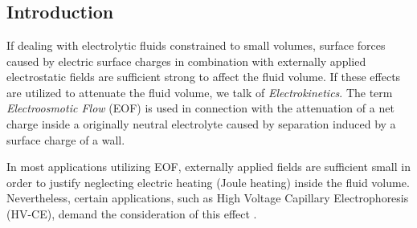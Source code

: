 \chapter{}
\noindent
{}
\begin{versiona}

\section{Introduction}

If dealing with electrolytic fluids constrained to small volumes, surface forces caused by electric surface charges in combination with externally applied electrostatic fields are sufficient strong to affect the fluid volume. If these effects are utilized to attenuate the fluid volume, we talk of \textit{Electrokinetics}. The term \textit{Electroosmotic Flow} (EOF) is used in connection with the attenuation of a net charge inside a originally neutral electrolyte caused by separation induced by a surface charge of a wall.

In most applications utilizing EOF, externally applied fields are sufficient small in order to justify neglecting electric heating (Joule heating) inside the fluid volume. Nevertheless, certain applications, such as High Voltage Capillary Electrophoresis (HV-CE), demand the consideration of this effect \cite{KnoMcC1994}.


\end{versiona}
